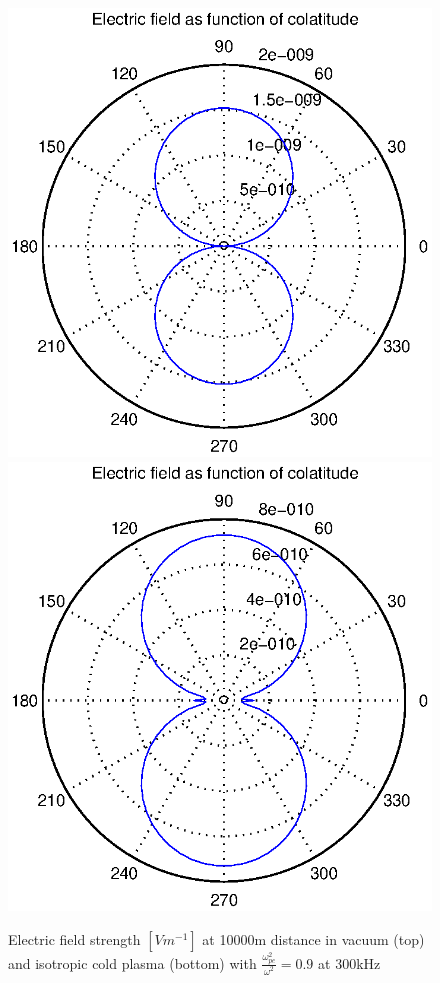 \documentclass[a4paper,11pt]{thesis}
\begin{document}
\begin{figure}
\begin{center}
 \includegraphics[width=11.5cm]{DissPics/NFvac10000m300kHz.eps}
\includegraphics[width=11.5cm]{DissPics/NFisocold10000m300kHz0.9.eps}
  \caption{Electric field strength $[Vm^{-1}]$ at 10000m distance in vacuum (top) and isotropic cold plasma (bottom) with $\frac{\omega_{pe}^2}{\omega^2}=0.9$ at 300kHz}\label{figNFisocold1000m300kHz0.9}
\end{center}
\end{figure}
\end{document}
